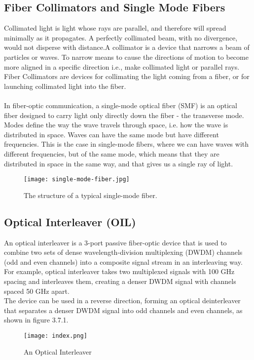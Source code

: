 \documentclass[hidelinks, 12pt]{report}
\begin{document}
\subsection{Fiber Collimators and Single Mode Fibers}
Collimated light is light whose rays are parallel, and therefore will spread minimally as it propagates. A perfectly collimated beam, with no divergence, would not disperse with distance.A collimator is a device that narrows a beam of particles or waves. To narrow means to cause the directions of motion to become more aligned in a specific direction i.e., make collimated light or parallel rays.
Fiber Collimators are devices for collimating the light coming from a fiber, or for launching collimated light into the fiber.\\
\\In fiber-optic communication, a single-mode optical fiber (SMF) is an optical fiber designed to carry light only directly down the fiber - the transverse mode. Modes define the way the wave travels through space, i.e. how the wave is distributed in space. Waves can have the same mode but have different frequencies. This is the case in single-mode fibers, where we can have waves with different frequencies, but of the same mode, which means that they are distributed in space in the same way, and that gives us a single ray of light. 
\begin{figure}[H]
\centering
\texttt{[image: single-mode-fiber.jpg]}
\caption[The structure of a typical single-mode fiber.
]{The structure of a typical single-mode fiber.
}
\label{The structure of a typical single-mode fiber.}
\end{figure}
\subsection{Optical Interleaver (OIL)}
\justify
An optical interleaver is a 3-port passive fiber-optic device that is used to combine two sets of dense wavelength-division multiplexing (DWDM) channels (odd and even channels) into a composite signal stream in an interleaving way. For example, optical interleaver takes two multiplexed signals with 100 GHz spacing and interleaves them, creating a denser DWDM signal with channels spaced 50 GHz apart. 
\\The device can be used in a reverse direction, forming an optical deinterleaver that separates a denser DWDM signal into odd channels and even channels, as shown in figure 3.7.1.
\begin{figure}[H]
\centering
\texttt{[image: index.png]}
\caption[An Optical Interleaver]{An Optical Interleaver}
\label{An Optical Interleaver}
\end{figure}
\end{document}
